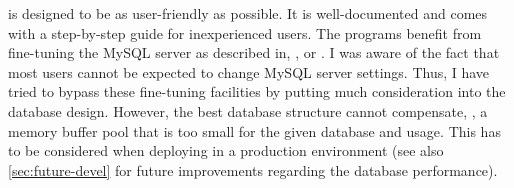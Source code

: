 \pname is designed to be as user-friendly as possible. It is well-documented and
comes with a step-by-step guide for inexperienced users. The \pname
programs benefit from fine-tuning the MySQL server as described in, \eg,
\citet{schwartz2012} or \citet{schneider2005}. I was aware of the fact that most
users cannot be expected to change MySQL server settings. Thus, I have tried to
bypass these fine-tuning facilities by putting much consideration into the
database design. However, the best database structure cannot compensate, \eg, a
memory buffer pool that is too small for the given database and usage. This has
to be considered when deploying \pname in a production environment (see also
\autoref{sec:future-devel} for future improvements regarding the database
performance).
